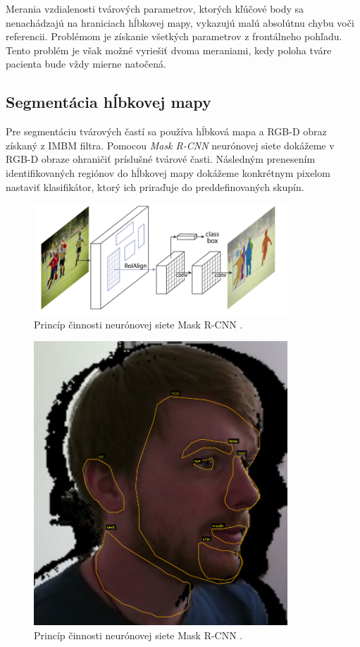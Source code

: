 Merania vzdialenosti tvárových parametrov, ktorých kľúčové body sa nenachádzajú na hraniciach hĺbkovej mapy, vykazujú malú absolútnu chybu voči referencii. Problémom je získanie všetkých parametrov z frontálneho pohľadu. Tento problém je však možné vyriešiť dvoma meraniami, kedy poloha tváre pacienta bude vždy mierne natočená.

\subsection{Segmentácia hĺbkovej mapy}

Pre segmentáciu tvárových častí sa používa hĺbková mapa a RGB-D obraz získaný z IMBM filtra. Pomocou \textit{Mask R-CNN} neurónovej siete dokážeme v RGB-D obraze ohraničiť príslušné tvárové časti. Následným prenesením identifikovaných regiónov do hĺbkovej mapy dokážeme konkrétnym pixelom nastaviť klasifikátor, ktorý ich priraďuje do preddefinovaných skupín.

\begin{figure}[H]
	\centering
	\includegraphics[width=0.85\textwidth]{figures/mask_rcnn.png}
	\caption{Princíp činnosti neurónovej siete Mask R-CNN .}
	\label{fig:mask_rcnn}
\end{figure}

\begin{figure}[H]
	\centering
	\includegraphics[width=0.85\textwidth]{figures/rcnn_label3.png}
	\caption{Princíp činnosti neurónovej siete Mask R-CNN .}
	\label{fig:mask_label}
\end{figure}



